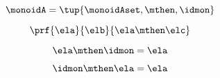 \begin{forslides}
            
             \begin{equation}
                \label{eq:semicats-slides-142}
                \monoidA = \tup{\monoidAset, \mthen, \idmon}
            \end{equation}
            
          
             \begin{equation}
                \label{eq:semicats-slides-143}
                \prf{
                \ela
                }{
                \elb
                }{
                \ela \mthen \elc
                }
            \end{equation}
            
             \begin{equation}
                \label{eq:semicats-slides-144}
                \ela \mthen \idmon = \ela
            \end{equation}
            
              
             \begin{equation}
                \label{eq:semicats-slides-145}
              \idmon \mthen \ela = \ela
          \end{equation}
           
   \begin{comment} 
             \begin{equation}
                \label{eq:semicats-slides-146}
                
            \end{equation}
            
            
            
                   \begin{equation}
                \label{eq:semicats-slides-147}
                
            \end{equation}
            
            
             \begin{equation}
              \label{eq:semicats-slides-148}
               
            \end{equation}
            
            
             \begin{equation}
                \label{eq:semicats-slides-149}
                
            \end{equation}
            

\end{comment}
\end{forslides}
